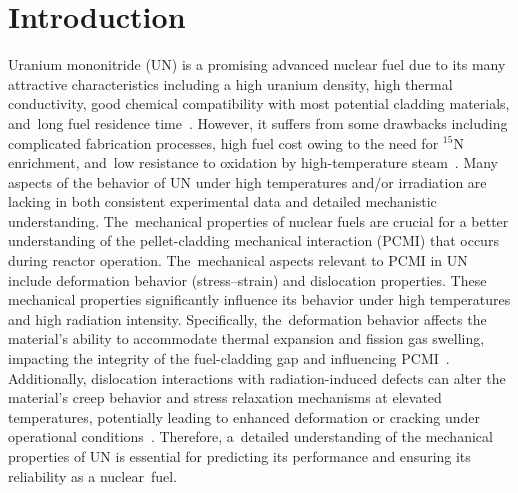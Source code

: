 \documentclass[applsci,article,accept,pdftex,moreauthors]{Definitions/mdpi}
\newcommand{\?}{\stackrel{?}{=}}
\begin{document}
\section{Introduction}

Uranium mononitride (UN) is a promising advanced nuclear fuel due to its many attractive characteristics including a high uranium density, high thermal conductivity, good chemical compatibility with most potential cladding materials, and~long fuel residence time~\cite{Ekberg2018, Wallenius2020, Uno2020}. However, it suffers from some drawbacks including complicated fabrication processes, high fuel cost owing to the need for $^{15}$N enrichment, and~low resistance to oxidation by high-temperature steam~\cite{Ekberg2018, Wallenius2020, Uno2020}. Many aspects of the behavior of UN under high temperatures and/or irradiation are lacking in both consistent experimental data and detailed mechanistic understanding. The~mechanical properties of nuclear fuels are crucial for a better understanding of the pellet-cladding mechanical interaction (PCMI) that occurs during reactor operation. The~mechanical aspects relevant to PCMI in UN include deformation behavior (stress--strain) and dislocation properties. These mechanical properties significantly influence its behavior under high temperatures and high radiation intensity. Specifically, the~deformation behavior affects the material's ability to accommodate thermal expansion and fission gas swelling, impacting the integrity of the fuel-cladding gap and influencing PCMI~\cite{Olander2017, Olander2021}. Additionally, dislocation interactions with radiation-induced defects can alter the material's creep behavior and stress relaxation mechanisms at elevated temperatures, potentially leading to enhanced deformation or cracking under operational conditions~\cite{Olander2017, Olander2021}. Therefore, a~detailed understanding of the mechanical properties of UN is essential for predicting its performance and ensuring its reliability as a nuclear~fuel.

\end{document}
